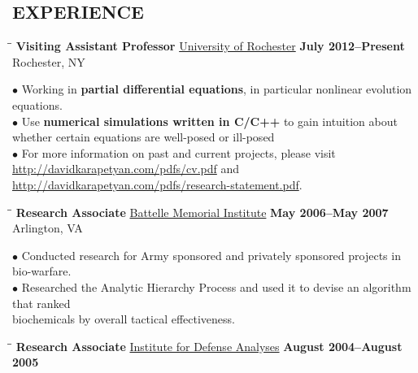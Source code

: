 \documentclass{resume}
\begin{document}
\begin{resume}
		 \section{EXPERIENCE}
	\vspace{0.05in}	
    \begin{tabbing}
		\hspace{2.3in}\= \hspace{2.6in}\= \kill
        {\bf Visiting Assistant Professor} \>\href{http://math.rochester.edu/}{University of Rochester}     
	\>\textbf{July 2012--Present} \\
		\>Rochester, NY 
	\end{tabbing}\vspace{-15pt}    
	$\bullet$ Working in \textbf{partial differential equations}, in particular nonlinear evolution equations.  
	\\
	$\bullet$ Use \textbf{numerical simulations written in C/C++} to gain intuition about whether certain equations are well-posed or ill-posed
	\\
$\bullet$ For more information on past and current projects, please visit \\
\href{http://davidkarapetyan.com/pdfs/cv.pdf}{http://davidkarapetyan.com/pdfs/cv.pdf} and \\ \href{http://davidkarapetyan.com/pdfs/research-statement.pdf}{http://davidkarapetyan.com/pdfs/research-statement.pdf}. 	
	\begin{tabbing}
		\hspace{2.3in}\= \hspace{2.6in}\= \kill
        {\bf Research Associate} \>\href{http://www.battelle.org/}{Battelle
        Memorial Institute}     
	\>\textbf{May 2006--May 2007} \\
		\>Arlington, VA
	\end{tabbing}\vspace{-15pt}    
	$\bullet$ Conducted research for Army sponsored and privately sponsored projects 
	in bio-warfare. \\ 
      $\bullet$ Researched the Analytic Hierarchy Process 
	and used it to devise an algorithm that ranked \\
	\phantom{$\bullet$} biochemicals by 
	overall tactical effectiveness.
	\begin{tabbing}
		\hspace{2.3in}\= \hspace{2.6in}\= \kill
        {\bf Research Associate } \>\href{https://www.ida.org/}{Institute for
        Defense Analyses} \>  
	\textbf{August 2004--August 2005}\\

\end{tabbing}
\end{resume}
\end{document}

